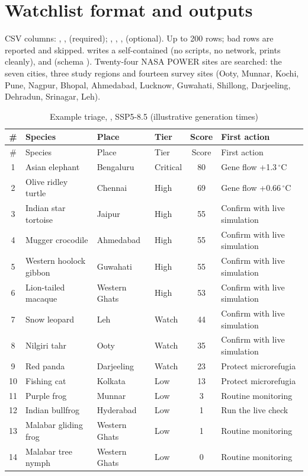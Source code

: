 \section{Watchlist format and outputs}
CSV columns: , ,  (required);
, , ,  (optional). Up to 200 rows;
bad rows are reported and skipped.  writes a
self-contained  (no scripts, no network, prints cleanly),
 and  (schema ).
Twenty-four NASA POWER sites are searched: the seven cities, three study regions
and fourteen survey sites (Ooty, Munnar, Kochi, Pune, Nagpur, Bhopal, Ahmedabad,
Lucknow, Guwahati, Shillong, Darjeeling, Dehradun, Srinagar, Leh).

{\small
\begin{longtable}{clllcl}
\caption{Example triage, , SSP5-8.5 (illustrative generation times)}\\
\toprule
\# & Species & Place & Tier & Score & First action \\
\midrule
\endfirsthead
\toprule
\# & Species & Place & Tier & Score & First action \\
\midrule
\endhead
1 & Asian elephant & Bengaluru & Critical & 80 & Gene flow +1.3\,$^{\circ}$C \\
2 & Olive ridley turtle & Chennai & High & 69 & Gene flow +0.66\,$^{\circ}$C \\
3 & Indian star tortoise & Jaipur & High & 55 & Confirm with live simulation \\
4 & Mugger crocodile & Ahmedabad & High & 55 & Confirm with live simulation \\
5 & Western hoolock gibbon & Guwahati & High & 55 & Confirm with live simulation \\
6 & Lion-tailed macaque & Western Ghats & High & 53 & Confirm with live simulation \\
7 & Snow leopard & Leh & Watch & 44 & Confirm with live simulation \\
8 & Nilgiri tahr & Ooty & Watch & 35 & Confirm with live simulation \\
9 & Red panda & Darjeeling & Watch & 23 & Protect microrefugia \\
10 & Fishing cat & Kolkata & Low & 13 & Protect microrefugia \\
11 & Purple frog & Munnar & Low & 3 & Routine monitoring \\
12 & Indian bullfrog & Hyderabad & Low & 1 & Run the live check \\
13 & Malabar gliding frog & Western Ghats & Low & 1 & Routine monitoring \\
14 & Malabar tree nymph & Western Ghats & Low & 0 & Routine monitoring \\
\bottomrule
\end{longtable}}

